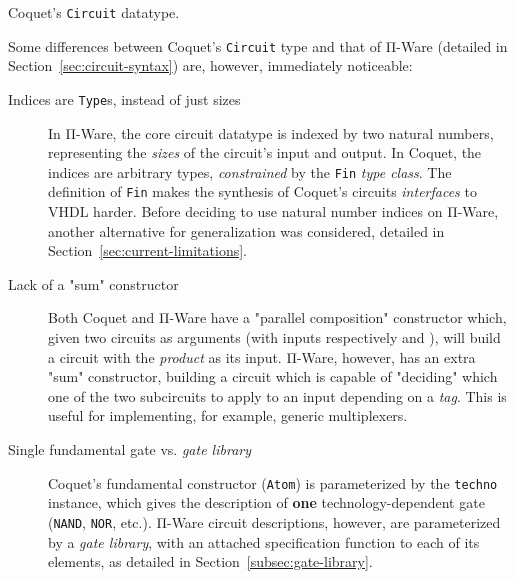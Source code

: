             \begin{listing}[h]
                \caption{Coquet's \texttt{Circuit} datatype.\label{lst:coquet-circuit}}
            \end{listing}

            Some differences between Coquet's \texttt{Circuit} type and that of Π-Ware
            (detailed in Section~\ref{sec:circuit-syntax}) are, however, immediately noticeable:

            \begin{description}
                \item[Indices are \texttt{Type}s, instead of just sizes]
                    In Π-Ware, the core circuit datatype is indexed by two natural numbers,
                    representing the \emph{sizes} of the circuit's input and output.
                    In Coquet, the indices are arbitrary types, \emph{constrained} by the
                    \texttt{Fin} \emph{type class}.
                    The definition of \texttt{Fin} makes the synthesis of Coquet's circuits
                    \emph{interfaces} to \ac{VHDL} harder.
                    Before deciding to use natural number indices on Π-Ware, another alternative
                    for generalization was considered, detailed in Section~\ref{sec:current-limitations}.

                \item[Lack of a "sum" constructor]
                    Both Coquet and Π-Ware have a "parallel composition" constructor
                    which, given two circuits as arguments (with inputs respectively  and ),
                    will build a circuit with the \emph{product}    as its input.
                    Π-Ware, however, has an extra "sum" constructor, building a circuit which is capable
                    of "deciding" which one of the two subcircuits to apply to an input depending on a \emph{tag}.
                    This is useful for implementing, for example, generic multiplexers.

                \item[Single fundamental gate vs. \emph{gate library}]
                    Coquet's fundamental constructor (\texttt{Atom}) is parameterized
                    by the \texttt{techno} instance, which gives the description of \textbf{one}
                    technology-dependent gate (\texttt{NAND}, \texttt{NOR}, etc.).
                    Π-Ware circuit descriptions, however, are parameterized by a \emph{gate library},
                    with an attached specification function to each of its elements,
                    as detailed in Section~\ref{subsec:gate-library}.
            \end{description}

